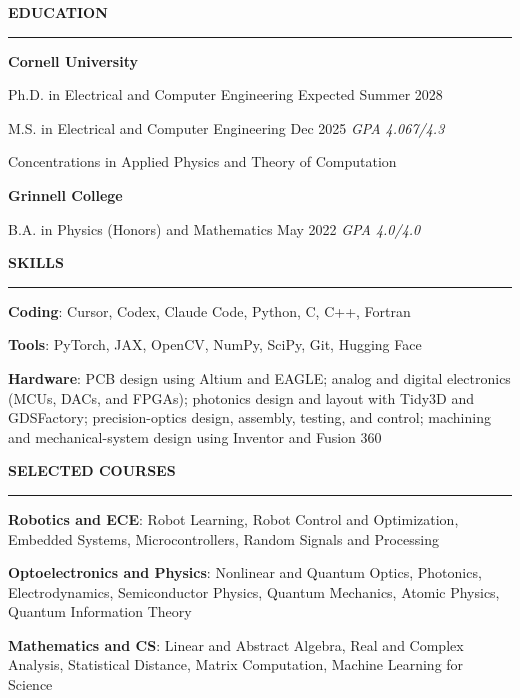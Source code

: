 \documentclass{article}
\newenvironment{rSection}[1]{%
  \smallskip
  \MakeUppercase{\textbf{#1}}
  \smallskip
  \hrule
  \begin{list}{}{%
    \setlength{\leftmargin}{0em}
    \setlength{\topsep}{0.25em}
    \setlength{\partopsep}{0pt}
    \setlength{\parsep}{0pt}
    \setlength{\itemsep}{0.15em}
  }
  \item[]
}{%
  \end{list}
}
\begin{document}

\begin{rSection}{Education}
\textbf{Cornell University}\par
Ph.D. in Electrical and Computer Engineering \hfill Expected Summer 2028\par
M.S. in Electrical and Computer Engineering \hfill Dec 2025 \quad \textit{GPA 4.067/4.3}\par
\hspace*{1.5em}Concentrations in Applied Physics and Theory of Computation\par\vspace{0.25em}
\textbf{Grinnell College}\par
B.A. in Physics (Honors) and Mathematics \hfill May 2022 \quad \textit{GPA 4.0/4.0}
\end{rSection}

\begin{rSection}{Skills}
\textbf{Coding}: Cursor, Codex, Claude Code, Python, C, C++, Fortran\par
\textbf{Tools}: PyTorch, JAX, OpenCV, NumPy, SciPy, Git, Hugging Face\par
\textbf{Hardware}: PCB design using Altium and EAGLE; analog and digital electronics (MCUs, DACs, and FPGAs); photonics design and layout with Tidy3D and GDSFactory; precision-optics design, assembly, testing, and control; machining and mechanical-system design using Inventor and Fusion 360\par
\end{rSection}

\begin{rSection}{Selected Courses}

\textbf{Robotics and ECE}: Robot Learning, Robot Control and Optimization, Embedded Systems, Microcontrollers, Random Signals and Processing

\textbf{Optoelectronics and Physics}: Nonlinear and Quantum Optics, Photonics, Electrodynamics, Semiconductor Physics, Quantum Mechanics, Atomic Physics, Quantum Information Theory

\textbf{Mathematics and CS}: Linear and Abstract Algebra, Real and Complex Analysis, Statistical Distance, Matrix Computation, Machine Learning for Science


\end{rSection}
\end{document}
